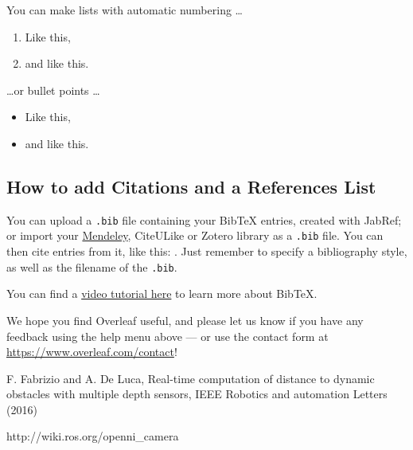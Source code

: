 \documentclass[smallextended]{svjour3}
\begin{document}
You can make lists with automatic numbering \dots

\begin{enumerate}
\item Like this,
\item and like this.
\end{enumerate}
\dots or bullet points \dots
\begin{itemize}
\item Like this,
\item and like this.
\end{itemize}

\subsection{How to add Citations and a References List}

You can upload a \verb|.bib| file containing your BibTeX entries, created with JabRef; or import your \href{https://www.overleaf.com/blog/184}{Mendeley}, CiteULike or Zotero library as a \verb|.bib| file. You can then cite entries from it, like this: \cite{greenwade93}. Just remember to specify a bibliography style, as well as the filename of the \verb|.bib|.

You can find a \href{https://www.overleaf.com/help/97-how-to-include-a-bibliography-using-bibtex}{video tutorial here} to learn more about BibTeX.

We hope you find Overleaf useful, and please let us know if you have any feedback using the help menu above --- or use the contact form at \url{https://www.overleaf.com/contact}!

%
%
\begin{thebibliography}{}

F. Fabrizio and A. De Luca, Real-time computation of distance to dynamic obstacles with multiple depth sensors, IEEE Robotics and automation Letters (2016)

http://wiki.ros.org/openni\_camera

\end{thebibliography}
\end{document}
